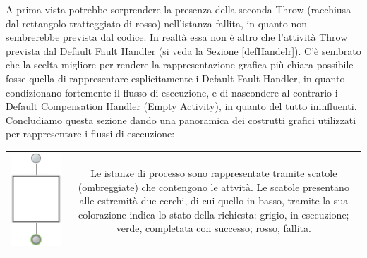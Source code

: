 A prima vista potrebbe sorprendere la presenza della seconda Throw (racchiusa
dal rettangolo tratteggiato di rosso) nell'istanza fallita, in quanto non
sembrerebbe prevista dal codice. In realtà essa non è altro che l'attività
Throw prevista dal Default Fault Handler (si veda la Sezione \ref{defHandelr}).
C'è sembrato che la scelta migliore per rendere la rappresentazione grafica più chiara possibile fosse
quella di rappresentare esplicitamente i Default Fault Handler, in quanto
condizionano fortemente il flusso di esecuzione, e di nascondere al contrario i
Default Compensation Handler (Empty Activity), in quanto del tutto ininfluenti.
\\

Concludiamo questa sezione dando una panoramica dei costrutti grafici utilizzati
per rappresentare i flussi di esecuzione:

\begin{tabular}{c  c}
\parbox[c][5cm][c]{0.2 \textwidth}
{\includegraphics[scale=0.48]{blide/dia/BlideInst}} &
\parbox[c][5cm][c]{0.6 \textwidth}{Le istanze di processo
sono rappresentate tramite scatole (ombreggiate) che contengono le attvità.
Le scatole presentano alle estremità due cerchi, di cui quello in basso,
tramite la sua colorazione indica lo stato della richiesta: grigio, in
esecuzione; verde, completata con successo; rosso, fallita.}\\
\end{tabular}

